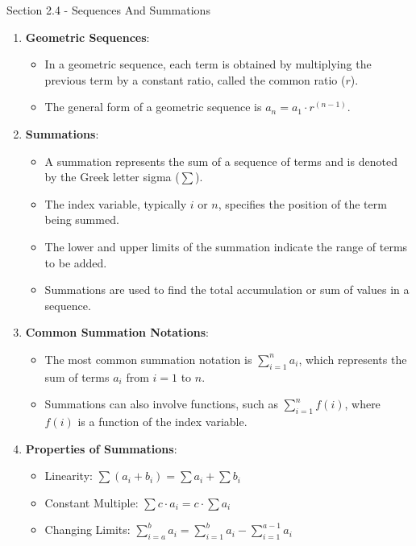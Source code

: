 \begin{notes}{Section 2.4 - Sequences And Summations}
\begin{enumerate}[label=\arabic*.]
        \item \textbf{Geometric Sequences}:
        \begin{itemize}
            \item In a geometric sequence, each term is obtained by multiplying the previous term by a constant ratio, called the common ratio ($r$).
            \item The general form of a geometric sequence is $a_n = a_1 \cdot r^{(n - 1)}$.
        \end{itemize}
        
        \item \textbf{Summations}:
        \begin{itemize}
            \item A summation represents the sum of a sequence of terms and is denoted by the Greek letter sigma ($\sum$).
            \item The index variable, typically $i$ or $n$, specifies the position of the term being summed.
            \item The lower and upper limits of the summation indicate the range of terms to be added.
            \item Summations are used to find the total accumulation or sum of values in a sequence.
        \end{itemize}
        
        \item \textbf{Common Summation Notations}:
        \begin{itemize}
            \item The most common summation notation is $\sum_{i=1}^{n} a_i$, which represents the sum of terms $a_i$ from $i = 1$ to $n$.
            \item Summations can also involve functions, such as $\sum_{i=1}^{n} f(i)$, where $f(i)$ is a function of the index variable.
        \end{itemize}
        
        \item \textbf{Properties of Summations}:
        \begin{itemize}
            \item Linearity: $\sum (a_i + b_i) = \sum a_i + \sum b_i$
            \item Constant Multiple: $\sum c \cdot a_i = c \cdot \sum a_i$
            \item Changing Limits: $\sum_{i=a}^{b} a_i = \sum_{i=1}^{b} a_i - \sum_{i=1}^{a-1} a_i$
        \end{itemize}
        

\end{enumerate}
\end{notes}
